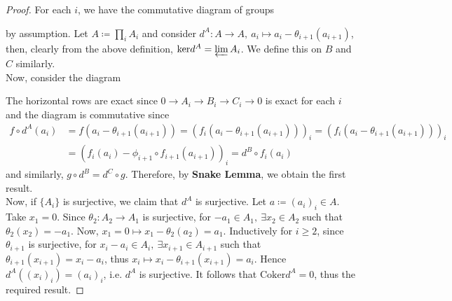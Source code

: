 \documentclass[12pt,a4paper,footinclude=true,headinclude=true]{scrbook} %
\begin{document}
\begin{proof}
    For each $i$, we have the commutative diagram of groups
    \begin{center}
    \end{center}
    by assumption. Let $A\coloneqq\prod_{i}A_i$ and consider $d^A:A\to A,\ a_i\mapsto a_i-\theta_{i+1}(a_{i+1})$, then, clearly from the above definition, $\mathrm{ker}d^A=\varprojlim A_i$. We define this on $B$ and $C$ similarly.\\ Now, consider the diagram
    \begin{center}
    \end{center}
    The horizontal rows are exact since $0\to A_i\to B_i\to C_i\to0$ is exact for each $i$ and the diagram is commutative since
    \begin{align*}
        f\circ d^A(a_i) &= f(a_i-\theta_{i+1}(a_{i+1}))=(f_i(a_i-\theta_{i+1}(a_{i+1})))_i=(f_i(a_i-\theta_{i+1}(a_{i+1})))_i \\ &=(f_i(a_i)-\phi_{i+1}\circ f_{i+1}(a_{i+1}))_i=d^B\circ f_i(a_i) 
    \end{align*}
    and similarly, $g\circ d^B=d^C\circ g$. Therefore, by \textbf{Snake Lemma}, we obtain the first result.\\ Now, if $\{A_i\}$ is surjective, we claim that $d^A$ is surjective. Let $a\coloneqq(a_i)_i\in A$. Take $x_1=0$. Since $\theta_2:A_2\to A_1$ is surjective, for $-a_1\in A_1,\ \exists x_2\in A_2$ such that $\theta_2(x_2)=-a_1$. Now, $x_1=0\mapsto x_1-\theta_2(a_2)=a_1$. Inductively for $i\geq2$, since $\theta_{i+1}$ is surjective, for $x_i-a_i\in A_i,\ \exists x_{i+1}\in A_{i+1}$ such that $\theta_{i+1}(x_{i+1})=x_i-a_i$, thus $x_i\mapsto x_i-\theta_{i+1}(x_{i+1})=a_i$. Hence $d^A((x_i)_i)=(a_i)_i$, i.e. $d^A$ is surjective. It follows that $\mathrm{Coker}d^A=0$, thus the required result. 
\end{proof}
\end{document}
